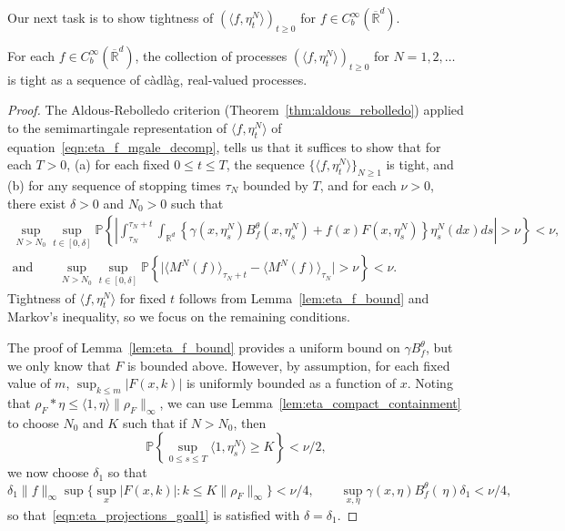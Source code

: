 \documentclass[EJP]{ejpecp} %
\newcommand{\IP}{\mathbb P}
\newcommand{\IR}{\mathbb R}
\newcommand{\kernel}{\rho}  %
\newcommand{\smooth}[1]{\kernel_{#1} \! * \!}  %
\begin{document}
Our next task is to show tightness of 
$(\langle f,\eta_t^N\rangle)_{t\geq 0}$ for 
$f\in C_b^\infty(\overline{\IR}^d)$. 

\begin{lemma}
    \label{lem:eta_projections_tightness}
	For each $f \in C^{\infty}_{b}(\overline{\IR}^d)$, 
the collection of processes
$(\langle f, \eta^{N}_t \rangle)_{t \geq 0}$
for $N = 1, 2, \ldots$ is tight
as a sequence of c\`adl\`ag, real-valued processes.
\end{lemma}
\begin{proof}
The Aldous-Rebolledo criterion (Theorem~\ref{thm:aldous_rebolledo})
applied to the semimartingale representation of $\langle f, \eta^N_t\rangle$
of equation~\eqref{eqn:eta_f_mgale_decomp}, tells us
that it suffices to show that for each $T>0$,
(a) for each fixed $0\leq t\leq T$, the sequence $\{\langle f, \eta^N_t \rangle\}_{N \ge 1}$ is tight,
and (b) for any sequence of stopping times $\tau_N$ bounded by $T$,
and for each $\nu > 0$, there exist $\delta > 0$ and $N_0 > 0$ such that 
\begin{gather}
        \label{eqn:eta_projections_goal1}
    \sup_{N > N_0}
    \sup_{t \in [0, \delta]}
    \IP\left\{\left|
            \int_{\tau_N}^{\tau_N + t}
            \int_{\IR^d}
            \left\{
                \gamma(x, \eta^N_s) B^\theta_f(x, \eta^N_s)
                + f(x) F(x, \eta^N_s)
            \right\} 
            \eta^N_s(dx)
            ds
        \right|> \nu \right\}
        < \nu ,
    \\ \text{and} \qquad
        \label{eqn:eta_projections_goal2}
    \sup_{N > N_0}
    \sup_{t \in [0, \delta]}
    \IP\left\{\big|
        \langle M^{N}(f) \rangle_{\tau_N + t} 
            - \langle M^{N}(f) \rangle_{\tau_N} \big|
        > \nu
    \right\}
    < \nu.
\end{gather}
Tightness of $\langle f, \eta^N_t\rangle$ for fixed $t$
follows from Lemma~\ref{lem:eta_f_bound} and Markov's inequality,
so we focus on the remaining conditions.

The proof of Lemma~\ref{lem:eta_f_bound}
provides a uniform bound on $\gamma B^\theta_f$, but we only know
that $F$ is bounded above. However, by assumption, for each fixed value of
$m$, $\sup_{k\leq m}|F(x,k)|$ is uniformly bounded as a function of $x$.
Noting that $\smooth{F}\eta\leq \langle 1,\eta\rangle\|\rho_F\|_\infty$,
we can use Lemma~\ref{lem:eta_compact_containment} 
to choose $N_0$ and $K$ such that
if $N > N_0$, then
$$
    \IP\left\{\sup_{0\leq s\leq T}\langle 1, \eta_s^N\rangle\geq K\right\} < \nu/2,
$$
we now choose $\delta_1$ so that
$$
    \delta_1 \|f\|_\infty \sup\big\{ \sup_{x}|F(x,k)| : k\leq K\|\rho_F\|_\infty \big\}
    <
    \nu/4,
    \qquad
    \sup_{x,\eta}\gamma(x,\eta)B^\theta_f(\,\eta)\delta_1 < \nu/4,
$$
so that~\eqref{eqn:eta_projections_goal1} is satisfied with $\delta = \delta_1$.


\end{proof}
\end{document}
